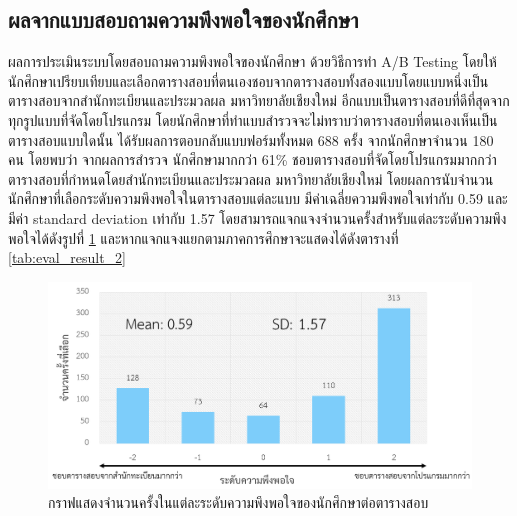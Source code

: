 \subsection{ผลจากแบบสอบถามความพึงพอใจของนักศึกษา}
ผลการประเมินระบบโดยสอบถามความพึงพอใจของนักศึกษา ด้วยวิธีการทำ A/B Testing 
โดยให้นักศึกษาเปรียบเทียบและเลือกตารางสอบที่ตนเองชอบจากตารางสอบทั้งสองแบบโดยแบบหนึ่งเป็นตารางสอบจากสำนักทะเบียนและประมวลผล มหาวิทยาลัยเชียงใหม่ 
อีกแบบเป็นตารางสอบที่ดีที่สุดจากทุกรูปแบบที่จัดโดยโปรแกรม โดยนักศึกษาที่ทำแบบสำรวจจะไม่ทราบว่าตารางสอบที่ตนเองเห็นเป็นตารางสอบแบบใดนั้น 
ได้รับผลการตอบกลับแบบฟอร์มทั้งหมด 688 ครั้ง จากนักศึกษาจำนวน 180 คน
โดยพบว่า จากผลการสำรวจ นักศึกษามากกว่า 61\% ชอบตารางสอบที่จัดโดยโปรแกรมมากกว่าตารางสอบที่กำหนดโดยสำนักทะเบียนและประมวลผล มหาวิทยาลัยเชียงใหม่
โดยผลการนับจำนวนนักศึกษาที่เลือกระดับความพึงพอใจในตารางสอบแต่ละแบบ มีค่าเฉลี่ยความพึงพอใจเท่ากับ 0.59 และมีค่า standard deviation เท่ากับ 1.57 
โดยสามารถแจกแจงจำนวนครั้งสำหรับแต่ละระดับความพึงพอใจได้ดังรูปที่ \ref{fig:eval_result_1} และหากแจกแจงแยกตามภาคการศึกษาจะแสดงได้ดังตารางที่ \ref{tab:eval_result_2} 
\begin{figure}
    \begin{center}
      \includegraphics[width=\linewidth]{images/eval_result_1.png}
    \end{center}
    \caption[กราฟแสดงจำนวนครั้งในแต่ละระดับความพึงพอใจของนักศึกษาต่อตารางสอบ]{กราฟแสดงจำนวนครั้งในแต่ละระดับความพึงพอใจของนักศึกษาต่อตารางสอบ}
    \label{fig:eval_result_1}     
\end{figure}

